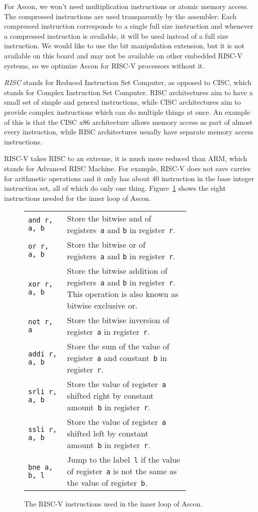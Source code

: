 For Ascon, we won't need multiplication instructions or atomic memory access.
The compressed instructions are used transparently by the assembler: Each
compressed instruction corresponds to a single full size instruction and
whenever a compressed instruction is available, it will be used instead of a
full size instruction. We would like to use the bit manipulation extension, but
it is not available on this board and may not be available on other embedded
RISC-V systems, so we optimize Ascon for RISC-V processors without it.

\emph{RISC} stands for Reduced Instruction Set Computer, as opposed to CISC,
which stands for Complex Instruction Set Computer. RISC architectures aim to
have a small set of simple and general instructions, while CISC architectures
aim to provide complex instructions which can do multiple things at once. An
example of this is that the CISC x86 architecture allows memory access as part
of almost every instruction, while RISC architectures usually have separate
memory access instructions.

RISC-V takes RISC to an extreme, it is much more reduced than ARM, which stands
for Advanced RISC Machine. For example, RISC-V does not save carries for
arithmetic operations and it only has about 40 instruction in the base integer
instruction set, all of which do only one thing. Figure~\ref{opcodes} shows the
eight instructions needed for the inner loop of Ascon.

\begin{figure}
\caption{The RISC-V instructions used in the inner loop of Ascon.}
\begin{tabular}{l p{0.76\linewidth}}
       \texttt{and r, a, b} & Store the bitwise and of registers~\texttt{a} and
        \texttt{b} in register~\texttt{r}.
    \\ \texttt{or r, a, b} & Store the bitwise or of registers~\texttt{a} and
        \texttt{b} in register~\texttt{r}.
    \\ \texttt{xor r, a, b} & Store the bitwise addition of registers~\texttt{a}
        and \texttt{b} in register~\texttt{r}. This operation is also known as
        bitwise exclusive or.
    \\ \texttt{not r, a} & Store the bitwise inversion of register~\texttt{a} in
        register~\texttt{r}.
    \\ \texttt{addi r, a, b} & Store the sum of the value of register~\texttt{a}
        and constant~\texttt{b} in register~\texttt{r}.
    \\ \texttt{srli r, a, b} & Store the value of register~\texttt{a} shifted
        right by constant amount~\texttt{b} in register~\texttt{r}.
    \\ \texttt{ssli r, a, b} & Store the value of register~\texttt{a} shifted
        left by constant amount~\texttt{b} in register~\texttt{r}.
    \\ \texttt{bne a, b, l} & Jump to the label~\texttt{l} if the value of
        register~\texttt{a} is not the same as the value of register~\texttt{b}.
\end{tabular}
\label{opcodes}
\end{figure}
